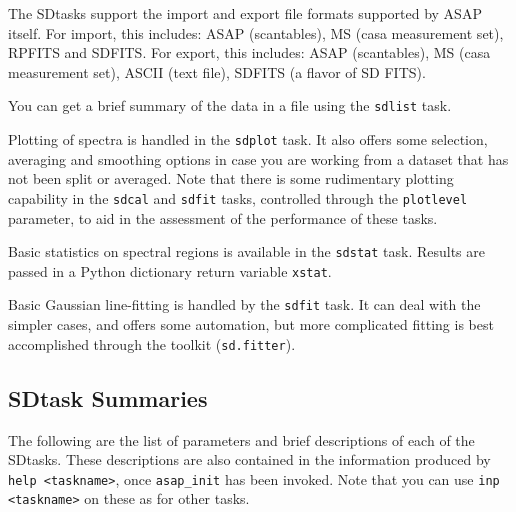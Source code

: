 The SDtasks support the import and export file formats supported
by ASAP itself.  For import, this includes:  ASAP (scantables), 
MS (casa measurement set), RPFITS and SDFITS.  For export, this
includes: ASAP (scantables), MS (casa measurement set),
ASCII (text file), SDFITS (a flavor of SD FITS).

You can get a brief summary of the data in a file using the {\tt sdlist}
task.

Plotting of spectra is handled in the {\tt sdplot} task.  It also offers
some selection, averaging and smoothing options in case you are
working from a dataset that has not been split or averaged.  Note that
there is some rudimentary plotting capability in the {\tt sdcal} and
{\tt sdfit} tasks, controlled through the {\tt plotlevel} parameter, 
to aid in the assessment of the performance of these tasks.

Basic statistics on spectral regions is available in the {\tt sdstat} task.
Results are passed in a Python dictionary return variable {\tt xstat}.

Basic Gaussian line-fitting is handled by the {\tt sdfit} task.  It can deal
with the simpler cases, and offers some automation, but more complicated
fitting is best accomplished through the toolkit ({\tt sd.fitter}).

\subsection{SDtask Summaries}
\label{section:sd.sdtasks.tasks}

The following are the list of parameters and
brief descriptions of each of the SDtasks.
These descriptions are also contained in the information produced
by {\tt help <taskname>}, once {\tt asap\_init} has been invoked.
Note that you can use {\tt inp <taskname>} on these as for other tasks.

